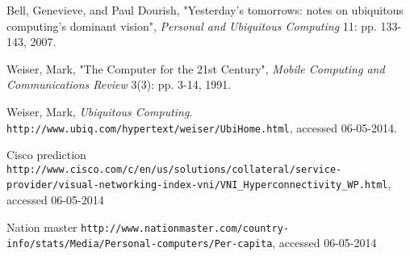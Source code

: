 \begin{thebibliography}{9}

        Bell, Genevieve, and Paul Dourish,
        "Yesterday's tomorrows: notes on ubiquitous computing's dominant vision",
        \emph{Personal and Ubiquitous Computing} 11: pp. 133-143,
        2007.
        
        Weiser, Mark,
        "The Computer for the 21st Century",
        \emph{Mobile Computing and Communications Review} 3(3): pp. 3-14,
        1991.
        
        Weiser, Mark,
        \emph{Ubiquitous Computing}.
        \verb+http://www.ubiq.com/hypertext/weiser/UbiHome.html+, accessed 06-05-2014.
        
        Cisco prediction
        \verb+http://www.cisco.com/c/en/us/solutions/collateral/service-provider/visual-networking-index-vni/VNI_Hyperconnectivity_WP.html+, accessed 06-05-2014
        
        Nation master
        \verb+http://www.nationmaster.com/country-info/stats/Media/Personal-computers/Per-capita+, accessed 06-05-2014
 
\end{thebibliography}